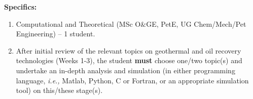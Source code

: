 \documentclass[12pts,a4paper,amsmath,amssymb,floatfix]{article}%
\newcommand{\all}{MSc O$\&$GE, PetE, UG Chem/Mech/Pet Engineering}
\newcommand{\ie}{{\it i.e., }}
\begin{document}
\begin{enumerate}[label=\bfseries Project: \arabic*:]
\noindent
{\bf Specifics:} 
\begin{enumerate}
\item Computational and Theoretical (\all) -- 1 student.
\item After initial review of the relevant topics on geothermal and oil recovery technologies (Weeks 1-3), the student {\bf must} choose one/two topic(s) and undertake an in-depth analysis and simulation (in either programming language, \ie Matlab, Python, C or Fortran, or an appropriate simulation tool) on this/these stage(s).
\end{enumerate}


\end{enumerate}
\end{document}
